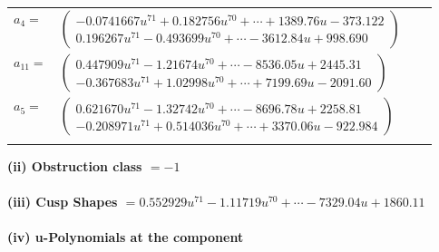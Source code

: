 \documentclass[1p]{elsarticle_modified}
\theoremstyle{definition}
\begin{document}
\begin{tabular}{m{7pt} m{180pt} m{7pt} m{180pt} }
\flushright $a_{4}=$&$\begin{pmatrix}-0.0741667 u^{71}+0.182756 u^{70}+\cdots+1389.76 u-373.122\\0.196267 u^{71}-0.493699 u^{70}+\cdots-3612.84 u+998.690\end{pmatrix}$ \\
\flushright $a_{11}=$&$\begin{pmatrix}0.447909 u^{71}-1.21674 u^{70}+\cdots-8536.05 u+2445.31\\-0.367683 u^{71}+1.02998 u^{70}+\cdots+7199.69 u-2091.60\end{pmatrix}$ \\
\flushright $a_{5}=$&$\begin{pmatrix}0.621670 u^{71}-1.32742 u^{70}+\cdots-8696.78 u+2258.81\\-0.208971 u^{71}+0.514036 u^{70}+\cdots+3370.06 u-922.984\end{pmatrix}$\\&\end{tabular}
\flushleft \textbf{(ii) Obstruction class $= -1$}\\~\\
\flushleft \textbf{(iii) Cusp Shapes $= 0.552929 u^{71}-1.11719 u^{70}+\cdots-7329.04 u+1860.11$}\\~\\
\newpage\renewcommand{\arraystretch}{1}
\flushleft \textbf{(iv) u-Polynomials at the component}\newline \\
\end{document}
